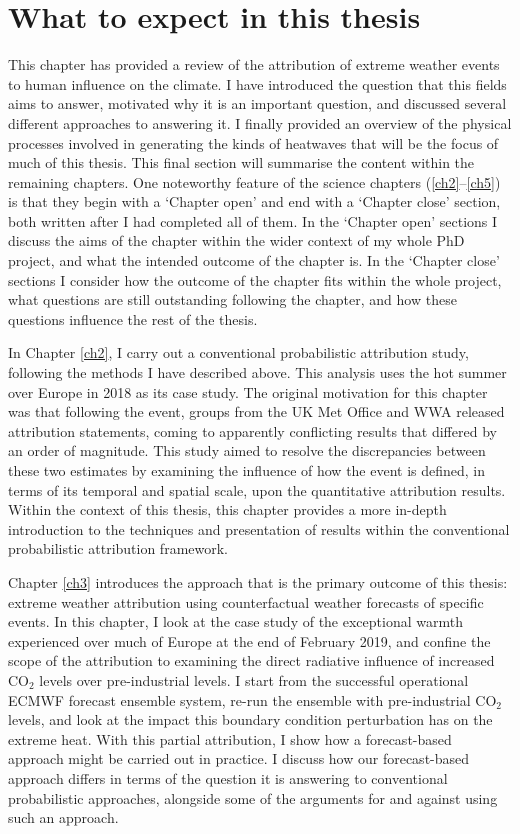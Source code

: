 \section{What to expect in this thesis}

  This chapter has provided a review of the attribution of extreme weather events to human influence on the climate. I have introduced the question that this fields aims to answer, motivated why it is an important question, and discussed several different approaches to answering it. I finally provided an overview of the physical processes involved in generating the kinds of heatwaves that will be the focus of much of this thesis. This final section will summarise the content within the remaining chapters. One noteworthy feature of the science chapters (\ref{ch2}--\ref{ch5}) is that they begin with a `Chapter open' and end with a `Chapter close' section, both written after I had completed all of them. In the `Chapter open' sections I discuss the aims of the chapter within the wider context of my whole PhD project, and what the intended outcome of the chapter is. In the `Chapter close' sections I consider how the outcome of the chapter fits within the whole project, what questions are still outstanding following the chapter, and how these questions influence the rest of the thesis.

  In Chapter \ref{ch2}, I carry out a conventional probabilistic attribution study, following the methods I have described above. This analysis uses the hot summer over Europe in 2018 as its case study. The original motivation for this chapter was that following the event, groups from the UK Met Office and WWA released attribution statements, coming to apparently conflicting results that differed by an order of magnitude. This study aimed to resolve the discrepancies between these two estimates by examining the influence of how the event is defined, in terms of its temporal and spatial scale, upon the quantitative attribution results. Within the context of this thesis, this chapter provides a more in-depth introduction to the techniques and presentation of results within the conventional probabilistic attribution framework.

  Chapter \ref{ch3} introduces the approach that is the primary outcome of this thesis: extreme weather attribution using counterfactual weather forecasts of specific events. In this chapter, I look at the case study of the exceptional warmth experienced over much of Europe at the end of February 2019, and confine the scope of the attribution to examining the direct radiative influence of increased CO$_2$ levels over pre-industrial levels. I start from the successful operational ECMWF forecast ensemble system, re-run the ensemble with pre-industrial CO$_2$ levels, and look at the impact this boundary condition perturbation has on the extreme heat. With this partial attribution, I show how a forecast-based approach might be carried out in practice. I discuss how our forecast-based approach differs in terms of the question it is answering to conventional probabilistic approaches, alongside some of the arguments for and against using such an approach.

